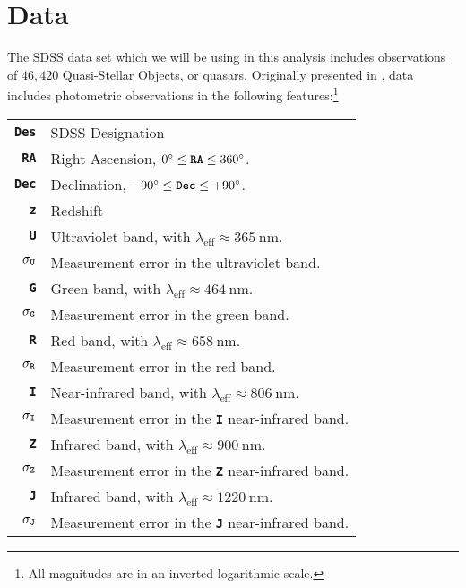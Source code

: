 \section{Data}
The SDSS data set which we will be using in this analysis includes observations of $46,420$ Quasi-Stellar Objects, or quasars. Originally presented in \cite{schneider2005}, data includes photometric observations in the following features:\footnote{All magnitudes are in an inverted logarithmic scale.} \\[1ex]

\begin{tabular}{@{}rp{8cm}@{}}
	\toprule
	\textbf{\texttt{Des}} & SDSS Designation \\
	\textbf{\texttt{RA}} & Right Ascension, $0^\circ \leq \text{\textbf{\texttt{RA}}} \leq 360^\circ$. \\
	\textbf{\texttt{Dec}} & Declination, $-90^\circ \leq \textbf{\texttt{Dec}} \leq +90^\circ$. \\
	\midrule
	\textbf{\texttt{z}} & Redshift  \\
	\midrule
	\textbf{\texttt{U}} & Ultraviolet band, with $\lambda_\text{eff} \approx \SI{365}{\nano\meter}$. \\
	$\sigma_\text{\textbf{\texttt{U}}}$ & Measurement error in the ultraviolet band. \\
	\textbf{\texttt{G}} & Green band, with $\lambda_\text{eff} \approx \SI{464}{\nano\meter}$. \\
	$\sigma_\text{\textbf{\texttt{G}}}$ & Measurement error in the green band. \\
	\textbf{\texttt{R}} & Red band, with $\lambda_\text{eff} \approx \SI{658}{\nano\meter}$. \\
	$\sigma_\text{\textbf{\texttt{R}}}$ & Measurement error in the red band. \\
	\textbf{\texttt{I}} & Near-infrared band, with $\lambda_\text{eff} \approx \SI{806}{\nano\meter}$. \\
	$\sigma_\text{\textbf{\texttt{I}}}$ & Measurement error in the \textbf{\texttt{I}} near-infrared band. \\
	\textbf{\texttt{Z}} & Infrared band, with $\lambda_\text{eff} \approx \SI{900}{\nano\meter}$. \\
	$\sigma_\text{\textbf{\texttt{Z}}}$ & Measurement error in the \textbf{\texttt{Z}} near-infrared band. \\
	\textbf{\texttt{J}} & Infrared band, with $\lambda_\text{eff} \approx \SI{1220}{\nano\meter}$. \\
	$\sigma_\text{\textbf{\texttt{J}}}$ & Measurement error in the \textbf{\texttt{J}} near-infrared band. \\

\end{tabular}
